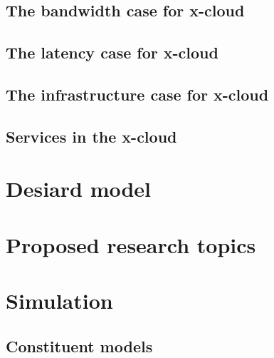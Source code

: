 \documentclass[conference]{IEEEtran}
\newcommand{\xcloud}{x-cloud }
\begin{document}
\subsection{The bandwidth case for \xcloud}


\subsection{The latency case for \xcloud}


\subsection{The infrastructure case for \xcloud}


\subsection{Services in the \xcloud}



\section{Desiard model}



\section{Proposed research topics}

%




%


\section{Simulation}

\subsection{Constituent models}

\end{document}
